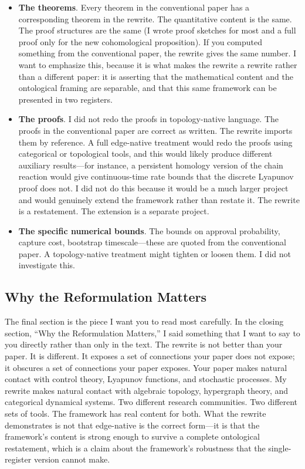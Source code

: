 \documentclass[11pt, a4paper]{article}
\begin{document}
\begin{itemize}[leftmargin=*]
    \item \textbf{The theorems}. Every theorem in the conventional paper has a corresponding theorem in the rewrite. The quantitative content is the same. The proof structures are the same (I wrote proof sketches for most and a full proof only for the new cohomological proposition). If you computed something from the conventional paper, the rewrite gives the same number. I want to emphasize this, because it is what makes the rewrite a rewrite rather than a different paper: it is asserting that the mathematical content and the ontological framing are separable, and that this same framework can be presented in two registers.

    \item \textbf{The proofs}. I did not redo the proofs in topology-native language. The proofs in the conventional paper are correct as written. The rewrite imports them by reference. A full edge-native treatment would redo the proofs using categorical or topological tools, and this would likely produce different auxiliary results---for instance, a persistent homology version of the chain reaction would give continuous-time rate bounds that the discrete Lyapunov proof does not. I did not do this because it would be a much larger project and would genuinely extend the framework rather than restate it. The rewrite is a restatement. The extension is a separate project.

    \item \textbf{The specific numerical bounds}. The bounds on approval probability, capture cost, bootstrap timescale---these are quoted from the conventional paper. A topology-native treatment might tighten or loosen them. I did not investigate this.
\end{itemize}

\subsection*{Why the Reformulation Matters}
The final section is the piece I want you to read most carefully. In the closing section, ``Why the Reformulation Matters,'' I said something that I want to say to you directly rather than only in the text. The rewrite is not better than your paper. It is different. It exposes a set of connections your paper does not expose; it obscures a set of connections your paper exposes. Your paper makes natural contact with control theory, Lyapunov functions, and stochastic processes. My rewrite makes natural contact with algebraic topology, hypergraph theory, and categorical dynamical systems. Two different research communities. Two different sets of tools. The framework has real content for both. What the rewrite demonstrates is not that edge-native is the correct form---it is that the framework's content is strong enough to survive a complete ontological restatement, which is a claim about the framework's robustness that the single-register version cannot make.
\end{document}
